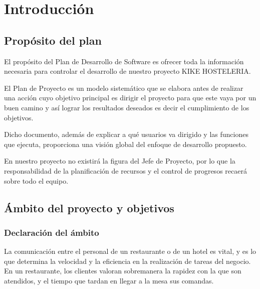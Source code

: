 \documentclass[spanish,a4paper,11pt, twoside]{report}	%
\begin{document}
\newpage
\mbox{}
\thispagestyle{empty}						%
\newpage


\tableofcontents 							%

\newpage
\mbox{}
\thispagestyle{empty}						%
\newpage



\chapter{Introducción}

	\section{Propósito del plan}
El propósito del Plan de Desarrollo de Software es ofrecer toda la información necesaria para controlar el desarrollo de nuestro proyecto KIKE HOSTELERIA.

El Plan de Proyecto es un modelo sistemático que se elabora antes de realizar una acción cuyo objetivo principal es dirigir el proyecto para que este vaya por un buen camino y así lograr los resultados deseados es decir el cumplimiento de los objetivos. 

Dicho documento, además de explicar a qué usuarios va dirigido y las funciones que ejecuta, proporciona una visión global del enfoque de desarrollo propuesto.


En nuestro proyecto no existirá la figura del Jefe de Proyecto, por lo que la responsabilidad de la planificación de recursos y el control de progresos recaerá sobre todo el equipo.

	\section{Ámbito del proyecto y objetivos}

		\subsection{Declaración del ámbito}
La comunicación entre el personal de un restaurante o de un hotel es vital, y es lo que determina la velocidad y la eficiencia en la realización de tareas del negocio. En un restaurante, los clientes valoran sobremanera la rapidez con la que son atendidos, y el tiempo que tardan en llegar a la mesa sus comandas. 
\end{document}
